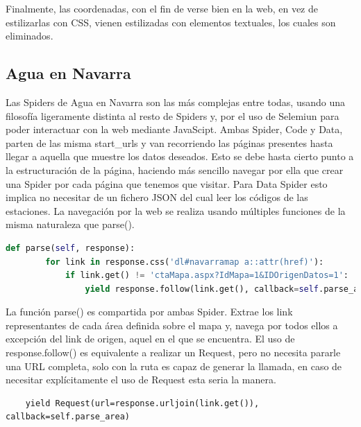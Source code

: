 Finalmente, las coordenadas, con el fin de verse bien en la web, en vez de estilizarlas con CSS, vienen estilizadas con elementos textuales, los cuales son eliminados.

\subsection{Agua en Navarra}
Las Spiders de Agua en Navarra son las más complejas entre todas, usando una filosofía ligeramente distinta al resto de Spiders y, por el uso de Selemiun para poder interactuar con la web mediante JavaScipt.\newline
\newline
Ambas Spider, Code y Data, parten de las misma start\_urls y van recorriendo las páginas presentes hasta llegar a aquella que muestre los datos deseados. Esto se debe hasta cierto punto a la estructuración de la página, haciendo más sencillo navegar por ella que crear una Spider por cada página que tenemos que visitar.\newline
\newline
Para Data Spider esto implica no necesitar de un fichero JSON del cual leer los códigos de las estaciones.\newline
\newline
La navegación por la web se realiza usando múltiples funciones de la misma naturaleza que parse().\newline
\newline

\begin{lstlisting}[language=Python, caption={Función parse() Agua en Navarra Spiders}]
	def parse(self, response):
		for link in response.css('dl#navarramap a::attr(href)'):
			if link.get() != 'ctaMapa.aspx?IdMapa=1&IDOrigenDatos=1':
				yield response.follow(link.get(), callback=self.parse_area)
\end{lstlisting}

La función parse() es compartida por ambas Spider. Extrae los link representantes de cada área definida sobre el mapa y, navega por todos ellos a excepción del link de origen, aquel en el que se encuentra.\newline
\newline
El uso de response.follow() es equivalente a realizar un Request, pero no necesita pararle una URL completa, solo con la ruta es capaz de generar la llamada, en caso de necesitar explícitamente el uso de Request esta seria la manera.

\begin{verbatim}
	yield Request(url=response.urljoin(link.get()), callback=self.parse_area)
\end{verbatim}

